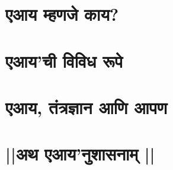 \chapter*{एआय म्हणजे काय? }




\chapter*{एआय'ची विविध रूपे }



% 
% 

% 
% 
% 
% 

% 
% 
% 
% 

\chapter*{एआय, तंत्रज्ञान आणि आपण  }


\chapter*{||अथ एआय'नुशासनाम् ||}
